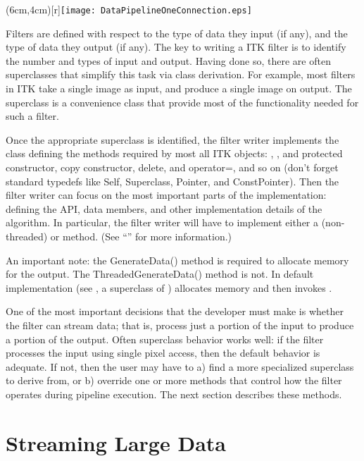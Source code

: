 \parpic(6cm,4cm)[r]{\texttt{[image: DataPipelineOneConnection.eps]}}


Filters are defined with respect to the type of data they input (if any), and
the type of data they output (if any). The key to writing a ITK filter is to
identify the number and types of input and output. Having done so, there are
often superclasses that simplify this task via class derivation. For example,
most filters in ITK take a single image as input, and produce a single image
on output. The superclass  is a convenience class that
provide most of the functionality needed for such a filter.

Once the appropriate superclass is identified, the filter writer implements the
class defining the methods required by most all ITK objects: ,
, and protected constructor, copy constructor, delete, and
operator=, and so on (don't forget standard typedefs like Self, Superclass,
Pointer, and ConstPointer). Then the filter writer can focus on the most
important parts of the implementation: defining the API, data members, and
other implementation details of the algorithm. In particular, the filter writer
will have to implement either a  (non-threaded) or
 method. (See ``'' for more information.)

An important note: the GenerateData() method is required to allocate memory for
the output. The ThreadedGenerateData() method is not. In default implementation
(see , a superclass of )
 allocates memory and then invokes
.

One of the most important decisions that the developer must make is whether
the filter can stream data; that is, process just a portion of the input to
produce a portion of the output. Often superclass behavior works well: if the
filter processes the input using single pixel access, then the default
behavior is adequate. If not, then the user may have to a) find a more
specialized superclass to derive from, or b) override one or more methods
that control how the filter operates during pipeline execution. The next
section describes these methods.



\section{Streaming Large Data}
\label{sec:StreamingLargeData}

